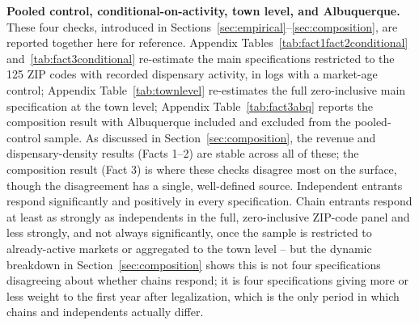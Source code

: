 \documentclass[english,12pt]{article}
\begin{document}
\textbf{Pooled control, conditional-on-activity, town level, and Albuquerque.} These four checks, introduced in Sections~\ref{sec:empirical}--\ref{sec:composition}, are reported together here for reference. Appendix Tables~\ref{tab:fact1fact2conditional} and~\ref{tab:fact3conditional} re-estimate the main specifications restricted to the 125 ZIP codes with recorded dispensary activity, in logs with a market-age control; Appendix Table~\ref{tab:townlevel} re-estimates the full zero-inclusive main specification at the town level; Appendix Table~\ref{tab:fact3abq} reports the composition result with Albuquerque included and excluded from the pooled-control sample. As discussed in Section~\ref{sec:composition}, the revenue and dispensary-density results (Facts 1--2) are stable across all of these; the composition result (Fact 3) is where these checks disagree most on the surface, though the disagreement has a single, well-defined source. Independent entrants respond significantly and positively in every specification. Chain entrants respond at least as strongly as independents in the full, zero-inclusive ZIP-code panel and less strongly, and not always significantly, once the sample is restricted to already-active markets or aggregated to the town level -- but the dynamic breakdown in Section~\ref{sec:composition} shows this is not four specifications disagreeing about whether chains respond; it is four specifications giving more or less weight to the first year after legalization, which is the only period in which chains and independents actually differ.
\end{document}

